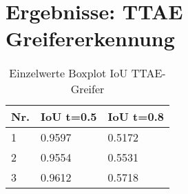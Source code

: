 \chapter{Ergebnisse: TTAE Greifererkennung}
\label{appendix:TTAEGreifer }

	
	
	\begin{table}[ht]
		\centering
		\begin{tabularx}{\textwidth}{lll}
			\textbf{Nr.}  & \textbf{IoU t=0.5} & \textbf{IoU t=0.8}  	 \\ \hline 
			1 & 0.9597 & 0.5172  \\
			2 & 0.9554 & 0.5531 \\
			3 & 0.9612 & 0.5718 \\
		\end{tabularx}
		\caption{Einzelwerte Boxplot IoU TTAE-Greifer}
		\label{table:EinzelwerteBoxplotIoUTTGreifer}
	\end{table}